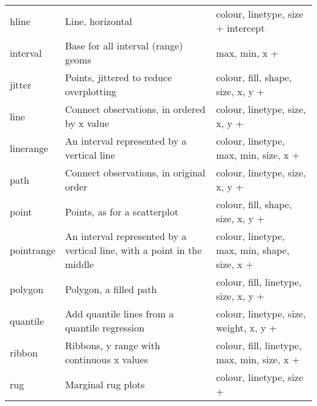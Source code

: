 \begin{table}
\begin{center}
\begin{tabular}{lp{2.5in}p{2.5in}}
    hline        & Line, horizontal                                                              & colour, linetype, size + intercept                                                   \\
    interval     & Base for all interval (range) geoms                                           & max, min, x +                                                                        \\
    jitter       & Points, jittered to reduce overplotting                                       & colour, fill, shape, size, x, y +                                                    \\
    line         & Connect observations, in ordered by x value                                   & colour, linetype, size, x, y +                                                       \\
    linerange    & An interval represented by a vertical line                                    & colour, linetype, max, min, size, x +                                                \\
    path         & Connect observations, in original order                                       & colour, linetype, size, x, y +                                                       \\
    point        & Points, as for a scatterplot                                                  & colour, fill, shape, size, x, y +                                                    \\
    pointrange   & An interval represented by a vertical line, with a point in the middle        & colour, linetype, max, min, shape, size, x +                                         \\
    polygon      & Polygon, a filled path                                                        & colour, fill, linetype, size, x, y +                                                 \\
    quantile     & Add quantile lines from a quantile regression                                 & colour, linetype, size, weight, x, y +                                               \\
    ribbon       & Ribbons, y range with continuous x values                                     & colour, fill, linetype, max, min, size, x +                                          \\
    rug          & Marginal rug plots                                                            & colour, linetype, size +                                                             \\

\end{tabular}
\end{center}
\end{table}
